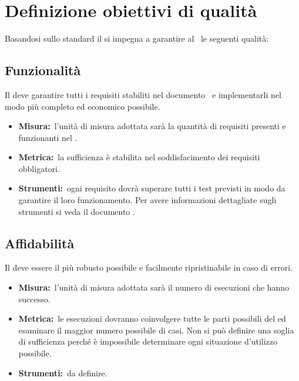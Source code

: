 
\section{Definizione obiettivi di qualità}
\label{sec:2}
	Basandosi sullo standard  il  si impegna a garantire al  \PROGETTO\ le seguenti qualità:
	\subsection{Funzionalità}
		Il  deve garantire tutti i requisiti stabiliti nel documento \ARdoc\ e implementarli nel modo più completo ed economico possibile.
		\begin{itemize}
			\item \textbf{Misura:}\ l'unità di misura adottata sarà la quantità di requisiti presenti e funzionanti nel .
			\item \textbf{Metrica:}\ la sufficienza è stabilita nel soddisfacimento dei requisiti obbligatori.
			\item \textbf{Strumenti:}\ ogni requisito dovrà superare tutti i test previsti in modo da garantire il loro funzionamento. Per avere informazioni dettagliate sugli strumenti si veda il documento \NPdoc. 
		\end{itemize}
	\subsection{Affidabilità}
		Il  deve essere il più robusto possibile e facilmente ripristinabile in caso di errori.
		\begin{itemize}
			\item \textbf{Misura:}\ l'unità di misura adottata sarà il numero di esecuzioni che hanno successo.
			\item \textbf{Metrica:}\ le esecuzioni dovranno coinvolgere tutte le parti possibili del  ed esaminare il maggior numero possibile di casi. Non si può definire una soglia di sufficienza perché è impossibile determinare ogni situazione d'utilizzo possibile.
			\item \textbf{Strumenti:}\ da definire.
		\end{itemize}
